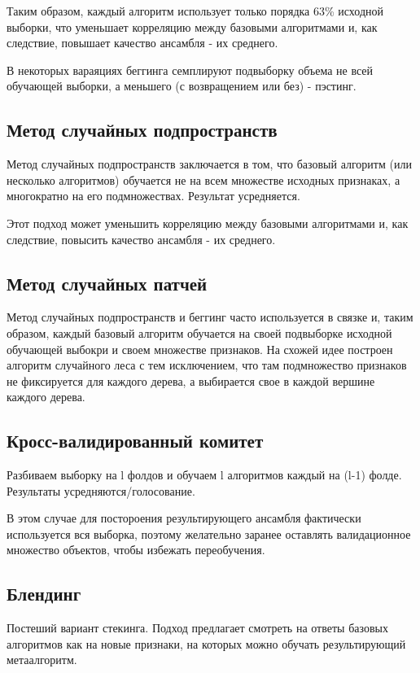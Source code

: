 Таким образом, каждый алгоритм использует только порядка 63\% исходной выборки, что уменьшает корреляцию между базовыми алгоритмами и, как следствие, повышает качество ансамбля - их среднего.

В некоторых вараяциях беггинга семплируют подвыборку объема не всей обучающей выборки, а меньшего (с возвращением или без) - пэстинг.  

\subsection{Метод случайных подпространств}

Метод случайных подпространств заключается в том, что базовый алгоритм (или несколько алгоритмов) обучается не на всем множестве исходных признаках, а многократно на его подмножествах. Результат усредняется.

Этот подход может уменьшить корреляцию между базовыми алгоритмами и, как следствие, повысить качество ансамбля - их среднего.

\subsection{Метод случайных патчей}

Метод случайных подпространств и беггинг часто используется в связке и, таким образом, каждый базовый алгоритм обучается на своей подвыборке исходной обучающей выбокри и своем множестве признаков. На схожей идее построен алгоритм случайного леса с тем исключением, что там подмножество признаков не фиксируется для каждого дерева, а выбирается свое в каждой вершине каждого дерева.

\subsection{Кросс-валидированный комитет}

Разбиваем выборку на l фолдов и обучаем l алгоритмов каждый на (l-1) фолде. Результаты усредняются/голосование.

В этом случае для постороения результирующего ансамбля фактически используется вся выборка, поэтому желательно заранее оставлять валидационное множество объектов, чтобы избежать переобучения. 

\subsection{Блендинг}

Постеший вариант стекинга. Подход предлагает смотреть на ответы базовых алгоритмов как на новые признаки, на которых можно обучать результирующий метаалгоритм.

